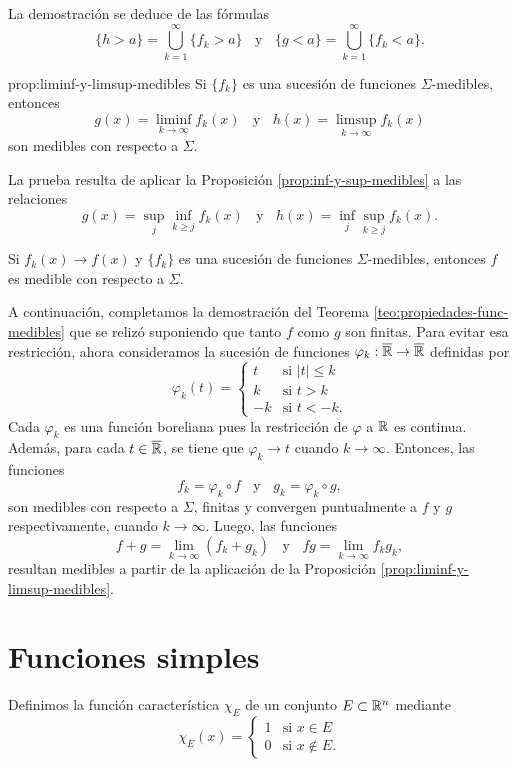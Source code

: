 La demostraci\'on se deduce de las f\'ormulas
\[
\{h>a \}=\bigcup_{k=1}^{\infty} \{f_k>a\}
\;\;\mbox{ y }\;\;
\{g<a \}=\bigcup_{k=1}^{\infty} \{f_k<a\}.
\]

\begin{proposicion}{prop:liminf-y-limsup-medibles}
Si $\{f_k\}$ es una sucesi\'on de funciones $\Sigma$-medibles, entonces
\[
g(x)=\liminf\limits_{k \to \infty} f_k(x)
\;\;\mbox{ y }
\;\;
h(x)=\limsup\limits_{k \to \infty} f_k(x)
\]
son   medibles con respecto a $\Sigma$.
\end{proposicion}


La prueba resulta de aplicar la Proposici\'on \ref{prop:inf-y-sup-medibles}
a las relaciones 
\[
g(x)=\sup\limits_{j} \inf\limits_{k\geq j} f_k(x)
\;\;\mbox{ y }\;\;
h(x)=\inf\limits_{j}\sup\limits_{k \geq j} f_k(x).
\]

\begin{corolario}{}
Si $f_k(x) \to f(x)$ y $\{f_k\}$ es una sucesi\'on de funciones $\Sigma$-medibles, entonces $f$ es medible con respecto a $\Sigma$.
\end{corolario}

A continuaci\'on, completamos la demostraci\'on del Teorema \ref{teo:propiedades-func-medibles} que se reliz\'o suponiendo
que tanto $f$ como $g$ son finitas. 
Para evitar esa restricci\'on, ahora consideramos la sucesi\'on de funciones $\varphi_k:\overline{\mathbb{R}} \to \overline{\mathbb{R}}$ definidas por
\[
\varphi_k(t)=
\left\{
\begin{array}{rl}
   t  &  \mbox{si } |t|\leq k \\
   k  &  \mbox{si } t>k\\
   -k &  \mbox{si } t<-k.
\end{array}
\right.
\]
Cada $\varphi_k$ es una funci\'on boreliana pues la restricci\'on de $\varphi$ a $\mathbb{R}$ es continua. Adem\'as, para cada $t\in \overline{\mathbb{R}}$, 
se tiene que $\varphi_k \to t$ cuando $k \to \infty$. Entonces, las funciones
\[
f_k=\varphi_k \circ f \;\;\mbox{ y }
\;\;
g_k=\varphi_k \circ g,
\]
son medibles con respecto a $\Sigma$, finitas y convergen puntualmente a $f$ y $g$ respectivamente, cuando $k  \to \infty$. Luego, las funciones 
\[
f+g=\lim\limits_{k \to \infty} (f_k +g_k)
\;\;\mbox{ y }\;\;
fg=\lim\limits_{k \to \infty} f_kg_k,
\]
resultan medibles a partir de la aplicaci\'on de la Proposici\'on \ref{prop:liminf-y-limsup-medibles}.

\section{Funciones simples}
Definimos la funci\'on caracter\'istica  $\chi_E$ de un conjunto $E \subset \mathbb{R}^n$ mediante
\[
\chi_E(x)=
\left\{
\begin{array}{ll}
   1  & \mbox{si } x \in E \\
   0  & \mbox{si } x \notin E.
\end{array}
\right.
\]

